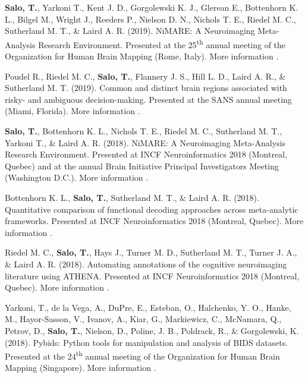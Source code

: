\documentclass[10pt]{article}
\newcommand{\textlink}[3][blue]{\href{#2}{\color{#1}{#3}}}
\begin{document}
\begin{hangparas}{.25in}{1}

	\textbf{Salo, T.}, Yarkoni T., Kent J. D., Gorgolewski K. J., Glerean E.,
	Bottenhorn K. L., Bilgel M., Wright J., Reeders P., Nielson D. N.,
	Nichols T. E., Riedel M. C., Sutherland M. T., \& Laird A. R. (2019).
	NiMARE: A Neuroimaging Meta-Analysis Research Environment.
	Presented at the 25\textsuperscript{th} annual meeting of the Organization
	for Human Brain Mapping (Rome, Italy).
	More information
	\textlink{https://ww5.aievolution.com/hbm1901/index.cfm?do=abs.viewAbs&abs=4138}{here}.

	\bigskip

	Poudel R., Riedel M. C., \textbf{Salo, T.}, Flannery J. S., Hill L. D.,
	Laird A. R., \& Sutherland M. T. (2019).
	Common and distinct brain regions associated with risky- and ambiguous decision-making.
	Presented at the SANS annual meeting (Miami, Florida).
	More information
	\textlink{https://nbclab.github.io/posters/poudel-sans-poster}{here}.

	\bigskip

	\textbf{Salo, T.}, Bottenhorn K. L., Nichols T. E., Riedel M. C.,
	Sutherland M. T., Yarkoni T., \& Laird A. R. (2018).
	NiMARE: A Neuroimaging Meta-Analysis Research Environment.
	Presented at INCF Neuroinformatics 2018 (Montreal, Quebec) and at the annual
	Brain Initiative Principal Investigators Meeting (Washington D.C.).
	More information
	\textlink{https://f1000research.com/posters/7-1221}{here}.

	\bigskip

	Bottenhorn K. L., \textbf{Salo, T.}, Sutherland M. T., \& Laird A. R. (2018).
	Quantitative comparison of functional decoding approaches across meta-analytic
	frameworks.
	Presented at INCF Neuroinformatics 2018 (Montreal, Quebec).
	More information
	\textlink{https://f1000research.com/posters/7-1222}{here}.

	\bigskip

	Riedel M. C., \textbf{Salo, T.}, Hays J., Turner M. D., Sutherland M. T.,
	Turner J. A., \& Laird A. R. (2018).
	Automating annotations of the cognitive neuroimaging literature using ATHENA.
	Presented at INCF Neuroinformatics 2018 (Montreal, Quebec).
	More information
	\textlink{https://f1000research.com/posters/7-1229}{here}.

	\bigskip

	Yarkoni, T., de la Vega, A., DuPre, E., Esteban, O., Halchenko, Y. O.,
	Hanke, M., Hayor-Sasson, V., Ivanov, A., Kiar, G., Markiewicz, C., McNamara, Q.,
	Petrov, D., \textbf{Salo, T.}, Nielson, D., Poline, J. B., Poldrack, R.,
	\& Gorgolewski, K. (2018).
	Pybids: Python tools for manipulation and analysis of BIDS datasets.
	Presented at the 24\textsuperscript{th} annual meeting of the Organization
	for Human Brain Mapping (Singapore).
	More information
	\textlink{https://ww5.aievolution.com/hbm1801/index.cfm?do=abs.viewAbs&abs=3300}{here}.


\end{hangparas}
\end{document}
